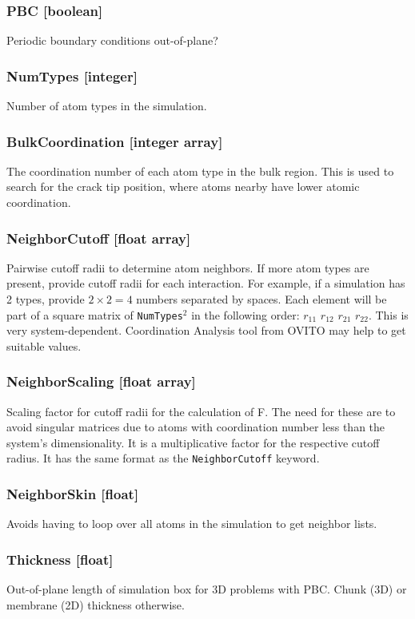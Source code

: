 \documentclass{ol-softwaremanual}
\begin{document}
\subsubsection*{PBC [boolean]}
Periodic boundary conditions out-of-plane?

\subsubsection*{NumTypes [integer]}
Number of atom types in the simulation.

\subsubsection*{BulkCoordination [integer array]}
The coordination number of each atom type in the bulk region. This is used to search for the crack tip position, where atoms nearby have lower atomic coordination.

\subsubsection*{NeighborCutoff [float array]}
Pairwise cutoff radii to determine atom neighbors. If more atom types are present, provide cutoff radii for each interaction. For example, if a simulation has 2 types, provide $2\times2=4$ numbers separated by spaces. Each element will be part of a square matrix of \verb|NumTypes|$^2$ in the following order: $r_{11}$ $r_{12}$ $r_{21}$ $r_{22}$. This is very system-dependent. Coordination Analysis tool from OVITO may help to get suitable values.

\subsubsection*{NeighborScaling [float array]}
Scaling factor for cutoff radii for the calculation of F. The need for these are to avoid singular matrices due to atoms with coordination number less than the system's dimensionality. It is a multiplicative factor for the respective cutoff radius. It has the same format as the \verb|NeighborCutoff| keyword.

\subsubsection*{NeighborSkin [float]}
Avoids having to loop over all atoms in the simulation to get neighbor lists.

\subsubsection*{Thickness [float]}
Out-of-plane length of simulation box for 3D problems with PBC. Chunk (3D) or membrane (2D) thickness otherwise.
\end{document}
